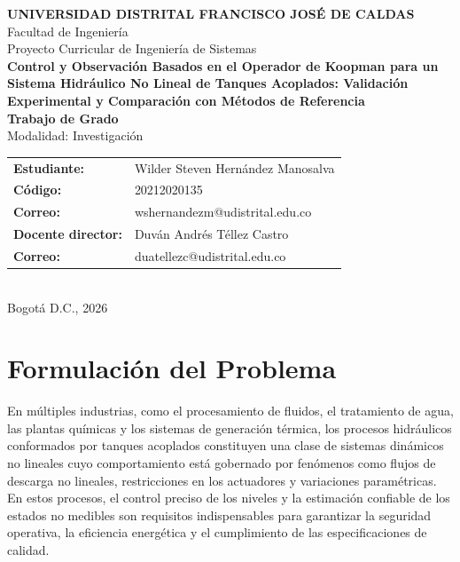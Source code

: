 \documentclass[12pt,letterpaper]{article}
\begin{document}
\begin{titlepage}
\begin{center}
{\large \textbf{UNIVERSIDAD DISTRITAL FRANCISCO JOS\'E DE CALDAS}}\\[0.3cm]
{\large Facultad de Ingenier\'ia}\\[0.3cm]
{\large Proyecto Curricular de Ingenier\'ia de Sistemas}\\[2cm]
{\LARGE \textbf{Control y Observaci\'on Basados en el Operador de Koopman para un Sistema Hidr\'aulico No Lineal de Tanques Acoplados: Validaci\'on Experimental y Comparaci\'on con M\'etodos de Referencia}}\\[2cm]
{\large \textbf{Trabajo de Grado}}\\[0.5cm]
{\large Modalidad: Investigaci\'on}\\[2cm]
\begin{tabular}{ll}
\textbf{Estudiante:} & Wilder Steven Hern\'andez Manosalva \\
\textbf{C\'odigo:}   & 20212020135 \\
\textbf{Correo:}     & wshernandezm@udistrital.edu.co \\[0.5cm]
\textbf{Docente director:} & Duv\'an Andr\'es T\'ellez Castro \\
\textbf{Correo:}     & duatellezc@udistrital.edu.co \\
\end{tabular}\\[3cm]
{\large Bogot\'a D.C., 2026}
\end{center}
\end{titlepage}

\tableofcontents
\newpage

\section{Formulación del Problema}
\label{sec:problema}

En múltiples industrias, como el procesamiento de fluidos, el tratamiento de agua,
las plantas químicas y los sistemas de generación térmica, los procesos hidráulicos
conformados por tanques acoplados constituyen una clase de sistemas dinámicos no lineales cuyo
comportamiento está gobernado por fenómenos como flujos de descarga no lineales,
restricciones en los actuadores y variaciones paramétricas. En estos procesos, el
control preciso de los niveles y la estimación confiable de los estados no medibles
son requisitos indispensables para garantizar la seguridad operativa, la eficiencia
energética y el cumplimiento de las especificaciones de calidad.
\end{document}
